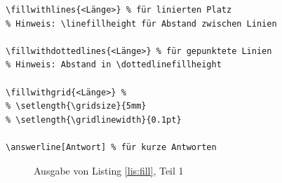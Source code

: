\begin{lstlisting}[caption={Beispiele für Linien und Gitter},label={lis:fill}]
\fillwithlines{<Länge>} % für linierten Platz
% Hinweis: \linefillheight für Abstand zwischen Linien

\fillwithdottedlines{<Länge>} % für gepunktete Linien
% Hinweis: Abstand in \dottedlinefillheight

\fillwithgrid{<Länge>} % 
% \setlength{\gridsize}{5mm}
% \setlength{\gridlinewidth}{0.1pt}

\answerline[Antwort] % für kurze Antworten
\end{lstlisting}

\begin{figure}[b]
\caption{Ausgabe von Listing \ref{lis:fill}, Teil 1}\label{fig:fill1}
\end{figure}

